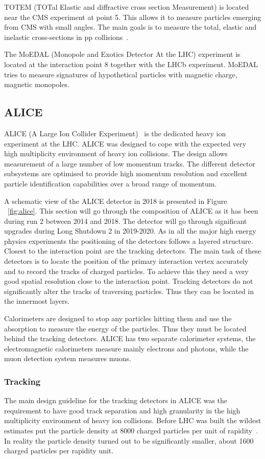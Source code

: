 TOTEM (TOTal Elastic and diffractive cross section Measurement) is located near the CMS experiment at point 5. This allows it to measure particles emerging from CMS with small angles. The main goals is to measure the total, elastic and inelastic cross-sections in pp collisions~\cite{TOTEM}.

The MoEDAL (Monopole and Exotics Detector At the LHC) experiment is located at the interaction point 8 together with the LHCb experiment. MoEDAL tries to measure signatures of hypothetical particles with magnetic charge, magnetic monopoles.




\subsection{ALICE}
\label{sec:alice}
ALICE (A Large Ion Collider Experiment)~\cite{ALICE} is the dedicated heavy ion experiment at the LHC. ALICE was designed to cope with the expected very high multiplicity environment of heavy ion collisions. The design allows measurement of a large number of low momentum tracks. The different detector subsystems are optimised to provide high momentum resolution and excellent particle identification capabilities over a broad range of momentum.

A schematic view of the ALICE detector in 2018 is presented in Figure ~\ref{fig:alice}. This section will go through the composition of ALICE as it has been during run 2 between 2014 and 2018. The detector will go through significant upgrades during Long Shutdown 2 in 2019-2020. As in all the major high energy physics experiments the positioning of the detectors follows a layered structure. Closest to the interaction point are the tracking detectors. The main task of these detectors is to locate the position of the primary interaction vertex accurately and to record the tracks of charged particles. To achieve this they need a very good spatial resolution close to the interaction point. Tracking detectors do not significantly alter the tracks of traversing particles. Thus they can be located in the innermost layers.

Calorimeters are designed to stop any particles hitting them and use the absorption to measure the energy of the particles. Thus they must be located behind the tracking detectors. ALICE has two separate calorimeter systems, the electromagnetic calorimeters measure mainly electrons and photons, while the muon detection system measures muons.


\subsubsection{Tracking}
The main design guideline for the tracking detectors in ALICE was the requirement to have good track separation and high granularity in the high multiplicity environment of heavy ion collisions. Before LHC was built the wildest estimates put the particle density at 8000 charged particles per unit of rapidity~\cite{}. In reality the particle density turned out to be significantly smaller, about 1600 charged particles per rapidity unit.~\cite{}

